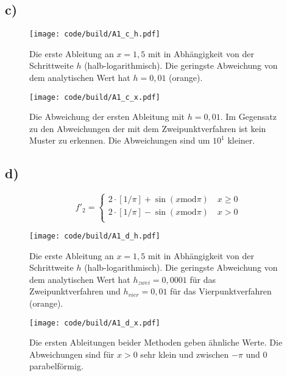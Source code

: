\subsection{c)}
\begin{figure}
    \centering
    \texttt{[image: code/build/A1\_c\_h.pdf]}
    \caption{Die erste Ableitung an $x=1,5$ mit in Abhängigkeit von der Schrittweite $h$ (halb-logarithmisch).
    Die geringste Abweichung von dem analytischen Wert hat $h=0,01$ (orange).}
\end{figure}

\begin{figure}
    \centering
    \texttt{[image: code/build/A1\_c\_x.pdf]}
    \caption{Die Abweichung der ersten Ableitung mit $h=0,01$. 
    Im Gegensatz zu den Abweichungen der mit dem Zweipunktverfahren ist kein Muster zu erkennen.
    Die Abweichungen sind um $10^1$ kleiner.}
\end{figure}
\FloatBarrier
\FloatBarrier
\subsection{d)}
\begin{equation}
    f'_2= 
    \begin{cases}
        2 \cdot  [1 / \pi] + \sin(x \text{mod} \pi) \quad x \geq 0 \\
        2 \cdot  [1 / \pi] - \sin(x \text{mod}  \pi) \quad x > 0 \\
    \end{cases}
\end{equation}

\begin{figure}
    \centering
    \texttt{[image: code/build/A1\_d\_h.pdf]}
    \caption{Die erste Ableitung an $x=1,5$ mit in Abhängigkeit von der Schrittweite $h$ (halb-logarithmisch).
    Die geringste Abweichung von dem analytischen Wert hat $h_{zwei}=0,0001$ für das Zweipunktverfahren und $h_{vier}=0,01$ für das Vierpunktverfahren (orange).}
\end{figure}

\begin{figure}
    \centering
    \texttt{[image: code/build/A1\_d\_x.pdf]}
    \caption{Die ersten Ableitungen beider Methoden geben ähnliche Werte.
    Die Abweichungen sind für $x>0$ sehr klein
    und zwischen $-\pi$ und $0$ parabelförmig.}
\end{figure}

